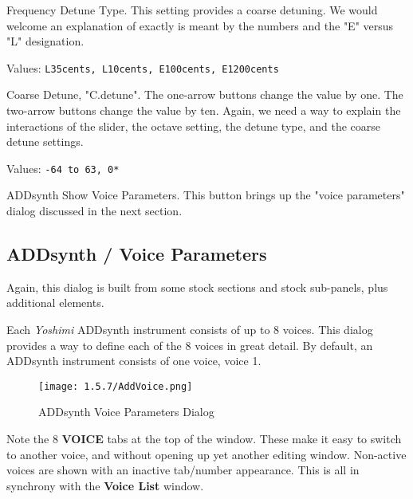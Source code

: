    Frequency Detune Type.
   This setting provides a coarse detuning.
   We would welcome an explanation of exactly is meant by the numbers and
   the "E" versus "L" designation.

   Values: \texttt{L35cents, L10cents, E100cents, E1200cents}

   Coarse Detune, "C.detune".
   The one-arrow buttons change the value by one.
   The two-arrow buttons change the value by ten.
   Again, we need a way to explain the interactions of the slider, the
   octave setting, the detune type, and the coarse detune settings.

   Values: \texttt{-64 to 63, 0*}

   ADDsynth Show Voice Parameters.
   This button brings up the "voice parameters" dialog discussed in the next
   section.

\subsection{ADDsynth / Voice Parameters}
\label{subsec:addsynth_voice_parameters}

   Again, this dialog is built from some stock sections and stock
   sub-panels, plus additional elements.

   Each \textsl{Yoshimi} ADDsynth instrument consists of up to 8 voices.
   This dialog provides a way to define each of the 8 voices in great
   detail.  By default, an ADDsynth instrument consists of one voice, voice 1.

\begin{figure}[H]
   \centering
   \texttt{[image: 1.5.7/AddVoice.png]}
   \caption{ADDsynth Voice Parameters Dialog}
   \label{fig:addsynth_voice_parameters_dialog}
\end{figure}

   Note the 8 \textbf{VOICE} tabs at the top of the window.
   These make it easy to switch to another voice, and without opening up yet
   another editing window.
   Non-active voices are shown with an inactive tab/number appearance.
   This is all in synchrony with the \textbf{Voice List} window.

